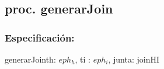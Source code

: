 \subsection{proc. generarJoin}
    \subsubsection{Especificaci\'on:}
        \begin{proc}{generarJoin}{\In th: $eph_{h}$, \In ti : $eph_{i}$, \Out junta: joinHI}{}
        \end{proc}
